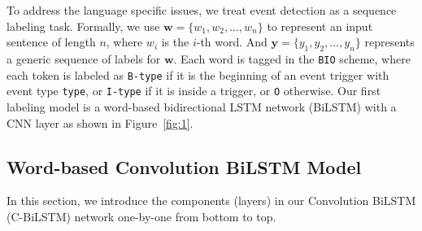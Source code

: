 To address the language specific issues, we treat event detection as a sequence labeling task. Formally, we use $\bm{w}=\{w_1, w_2, \ldots, w_n\}$ to represent an input sentence of length $n$, where $w_i$ is the $i$-th word. And $\bm{y}=\{y_1, y_2, \ldots, y_n\}$ represents a generic sequence of labels for $\bm{w}$. Each word is tagged in the \texttt{BIO} scheme, where each token is labeled as \texttt{B-type} if it is the beginning of an event trigger with event type \texttt{type}, or \texttt{I-type} if it is inside a trigger, or \texttt{O} otherwise. Our first labeling model is a word-based bidirectional LSTM network (BiLSTM) with a CNN layer as shown in Figure~\ref{fig:1}.

\subsection{Word-based Convolution BiLSTM Model \label{wcblstm}}
In this section, we introduce the components (layers) in our Convolution BiLSTM (C-BiLSTM) network one-by-one from bottom to top.
